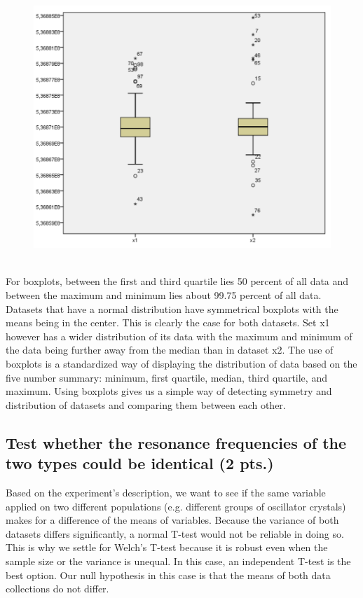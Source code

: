 \documentclass[14]{article}
\begin{document}
\begin{figure}[!htb]
	\includegraphics[width=1.0\textwidth]{img/question1/Question1_Boxplot.PNG}
	\captionsetup{width=1.0\textwidth}
	\centering
\end{figure}
\mbox{}\\ 
For boxplots, between the first and third quartile lies 50 percent of all data and between the maximum and minimum lies about 99.75 percent of all data. Datasets that have a normal distribution have symmetrical boxplots with the means being in the center. This is clearly the case for both datasets. Set x1 however has a wider distribution of its data with the maximum and minimum of the data being further away from the median than in dataset x2. 
\newline
The use of boxplots is a standardized way of displaying the distribution of data based on the five number summary: minimum, first quartile, median, third quartile, and maximum. Using boxplots gives us a simple way of detecting symmetry and distribution of datasets and comparing them between each other. 

\subsection{Test whether the resonance frequencies of the two types could be identical (2 pts.) }
Based on the experiment's description, we want to see if the same variable applied on two different populations (e.g. different groups of oscillator crystals) makes for a difference of the means of variables. Because the variance of both datasets differs significantly, a normal T-test would not be reliable in doing so. 
\newline
This is why we settle for Welch's T-test because it is robust even when the sample size or the variance is unequal. In this case, an independent T-test is the best option. Our null hypothesis in this case is that the means of both data collections do not differ. 
\end{document}
